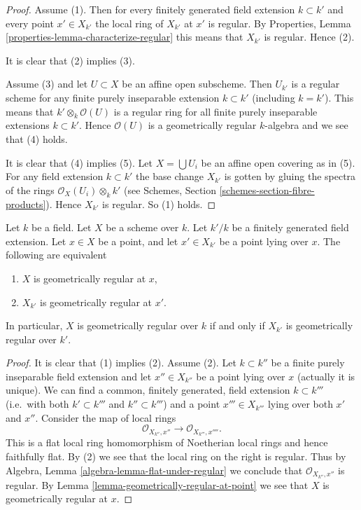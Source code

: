 \begin{proof}
Assume (1). Then for every finitely generated field extension
$k \subset k'$ and
every point $x' \in X_{k'}$ the local ring of $X_{k'}$ at $x'$
is regular. By Properties, Lemma \ref{properties-lemma-characterize-regular}
this means that $X_{k'}$ is regular. Hence (2).

\medskip\noindent
It is clear that (2) implies (3).

\medskip\noindent
Assume (3) and let $U \subset X$ be an affine open subscheme.
Then $U_{k'}$ is a regular scheme for any finite purely inseparable
extension $k \subset k'$ (including $k = k'$). This means that
$k' \otimes_k \mathcal{O}(U)$ is a regular ring for all
finite purely inseparable extensions $k \subset k'$. Hence
$\mathcal{O}(U)$ is a geometrically regular $k$-algebra
and we see that (4) holds.

\medskip\noindent
It is clear that (4) implies (5). Let $X = \bigcup U_i$ be an affine
open covering as in (5). For any field extension $k \subset k'$ the base
change $X_{k'}$ is gotten by gluing the spectra of the
rings $\mathcal{O}_X(U_i) \otimes_k k'$ (see
Schemes, Section \ref{schemes-section-fibre-products}).
Hence $X_{k'}$ is regular. So (1) holds.
\end{proof}

\begin{lemma}
\label{lemma-geometrically-regular-upstairs}
Let $k$ be a field.
Let $X$ be a scheme over $k$.
Let $k'/k$ be a finitely generated field extension.
Let $x \in X$ be a point, and let $x' \in X_{k'}$ be a point lying over $x$.
The following are equivalent
\begin{enumerate}
\item $X$ is geometrically regular at $x$,
\item $X_{k'}$ is geometrically regular at $x'$.
\end{enumerate}
In particular, $X$ is geometrically regular over $k$ if and only if
$X_{k'}$ is geometrically regular over $k'$.
\end{lemma}

\begin{proof}
It is clear that (1) implies (2). Assume (2).
Let $k \subset k''$ be a finite purely inseparable field extension
and let $x'' \in X_{k''}$ be a point lying over $x$ (actually it is
unique). We can find a common, finitely generated, field extension
$k \subset k'''$ (i.e.\ with both $k' \subset k'''$ and $k'' \subset k'''$)
and a point $x''' \in X_{k'''}$ lying over both $x'$ and $x''$.
Consider the map of local rings
$$
\mathcal{O}_{X_{k''}, x''} \longrightarrow \mathcal{O}_{X_{k'''}, x''''}.
$$
This is a flat local ring homomorphism of Noetherian local rings
and hence faithfully flat.
By (2) we see that the local ring on the right is regular.
Thus by Algebra, Lemma \ref{algebra-lemma-flat-under-regular}
we conclude that $\mathcal{O}_{X_{k''}, x''}$ is regular.
By Lemma \ref{lemma-geometrically-regular-at-point} we see that $X$
is geometrically regular at $x$.
\end{proof}

